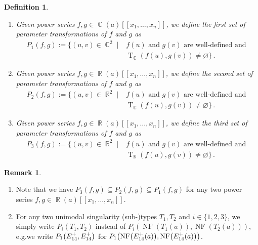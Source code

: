 \documentclass{amsproc}
\newtheorem{defn}[theorem]{Definition}
\theoremstyle{definition}
\newtheorem{remark}[theorem]{Remark}
\let\originalleft\left
\let\originalright\right
\renewcommand{\left}{\mathopen{}\mathclose\bgroup\originalleft}
\renewcommand{\right}{\aftergroup\egroup\originalright}
\DeclareMathOperator{\R}{\mathbb{R}}
\DeclareMathOperator{\C}{\mathbb{C}}
\DeclareMathOperator{\NF}{NF}
\DeclareMathOperator{\T}{T}
\begin{document}
\begin{defn}\label{def:Psets}
\leavevmode
\begin{enumerate}
\item
Given power series $f,g \in \C(a)[[x_1,\ldots,x_n]]$, we define the
first set of parameter transformations of $f$ and $g$ as
\begin{align*}
P_1(f, g)
:= \bigl\{ (u, v) \in \C^2 \mid
&f(u) \text{ and } g(v) \text{ are well-defined and } \\
&\T_{\C}(f(u), g(v)) \neq \varnothing \bigr\} \,.
\end{align*}

\item
Given power series $f,g \in \R(a)[[x_1,\ldots,x_n]]$, we define the
second set of parameter transformations of $f$ and $g$ as
\begin{align*}
P_2(f, g)
:= \bigl\{ (u, v) \in \R^2 \mid
&f(u) \text{ and } g(v) \text{ are well-defined and } \\
&\T_{\C}(f(u), g(v)) \neq \varnothing \bigr\} \,.
\end{align*}

\item
Given power series $f,g \in \R(a)[[x_1,\ldots,x_n]]$, we define the
third set of parameter transformations of $f$ and $g$ as
\begin{align*}
P_3(f, g)
:= \bigl\{ (u, v) \in \R^2 \mid
&f(u) \text{ and } g(v) \text{ are well-defined and } \\
&\T_{\R}(f(u), g(v)) \neq \varnothing \bigr\} \,.
\end{align*}
\end{enumerate}
\end{defn}

\begin{remark}
\leavevmode
\begin{enumerate}
\item
Note that we have $P_3(f, g) \subseteq P_2(f, g) \subseteq P_1(f, g)$ for any
two power series $f,g \in \R(a)[[x_1,\ldots,x_n]]$.

\item
For any two unimodal singularity (sub-)types $T_1, T_2$ and $i \in \{1,2,3\}$,
we simply write $P_i(T_1,T_2)$ instead of $P_i(\NF(T_1(a)), \NF(T_2(a)))$,
e.g.\@ we write $P_1\left(E_{14}^+, E_{14}^+\right)$ for
$P_1\left(\NF\left(E_{14}^+(a)\right), \NF\left(E_{14}^+(a)\right)\right)$.
\end{enumerate}
\end{remark}
\end{document}
